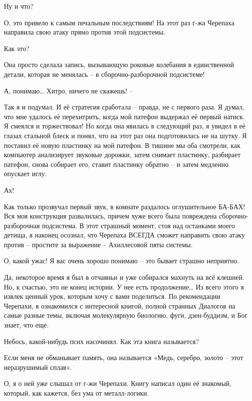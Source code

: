 \documentclass[../main.tex]{subfiles}
\begin{document}
\begin{dialogue}
 Ну и что?

 О, это привело к самым печальным последствиям! На этот раз г-жа Черепаха направила свою атаку прямо против этой подсистемы.

 Как это?

 Она просто сделала запись, вызывающую роковые колебания в единственной детали, которая не менялась \--- в сборочно-разборочной подсистеме!

 А, понимаю\ldots{} Хитро, ничего не скажешь! \---

 Так я и подумал. И её стратегия сработала \--- правда, не с первого раза. Я думал, что мне удалось её перехитрить, когда мой патефон выдержал её первый натиск. Я смеялся и торжествовал! Но когда она явилась в следующий раз, я увидел в её глазах стальной блеск и понял, что на этот раз она подготовилась не на шутку. Я поставил её новую пластинку на мой патефон. В тишине мы оба смотрели, как компьютер анализирует звуковые дорожки, затем снимает пластинку, разбирает патефон, снова собирает его, ставит пластинку обратно \--- и затем медленно опускает иглу.

 Ах!

 Как только прозвучал первый звук, в комнате раздалось оглушительное БА-БАХ! Вся моя конструкция развалилась, причем хуже всего была повреждена сборочно-разборочная подсистема. В этот страшный момент, стоя над останками моего детища, я наконец осознал, что Черепаха ВСЕГДА сможет направить свою атаку против \--- простите за выражение \--- Ахиллесовой пяты системы.

 О, какой ужас! Я вас очень хорошо понимаю \--- это бывает страшно неприятно.

 Да, некоторое время я был в отчаяньи и уже собирался махнуть на всё клешней. Но, к счастью, это не конец истории. У нее есть продолжение\ldots{} Из всего этого я извлек ценный урок, которым хочу с вами поделиться. По рекомендации Черепахи, я ознакомился с интересной книгой, полной странных Диалогов на самые разные темы, включая молекулярную биологию, фуги, дзен-буддизм, и Бог знает, что еще.

 Небось, какой-нибудь псих насочинял. Как эта книга называется?

 Если меня не обманывает память, она называется «Медь, серебро, золото \--- этот неразрушимый сплав».

 О, я о ней уже слышал от г-жи Черепахи. Книгу написал один её знакомый, который, как кажется, без ума от металл-логики.


\end{dialogue}
\end{document}
